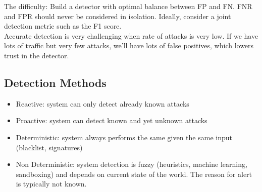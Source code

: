 \documentclass[11pt,oneside,a4paper]{article}
\begin{document}
\noindent The difficulty: Build a detector with optimal balance between FP and FN. FNR and FPR should never be considered in isolation. Ideally, consider a joint detection metric such as the F1 score.\\
Accurate detection is very challenging when rate of attacks is very low. If we have lots of traffic but very few attacks, we'll have lots of false positives, which lowers trust in the detector. 

\subsection{Detection Methods}

\vspace{-\topsep}
\begin{itemize}
	\setlength{\itemsep}{0pt}
	\setlength{\parskip}{0pt}
	\item Reactive: system can only detect already known attacks
	\item Proactive: system can detect known and yet unknown attacks
	\item Deterministic: system always performs the same given the same input (blacklist, signatures)
	\item Non Deterministic: system detection is fuzzy (heuristics, machine	learning, sandboxing) and depends on current state of the world. The reason for alert is typically not known.
\end{itemize}
\vspace{-\topsep}
\end{document}
